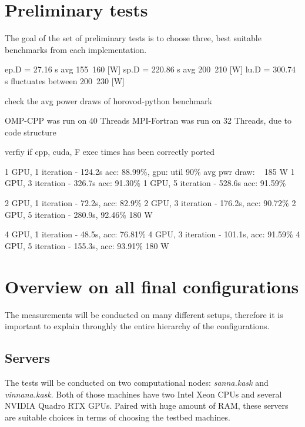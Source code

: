 \section{Preliminary tests}

The goal of the set of preliminary tests is to choose three, best suitable
benchmarks from each implementation. 

\newpage





\newpage







ep.D = 27.16 s          avg 155~160 [W]
sp.D = 220.86 s         avg 200~210 [W]
lu.D = 300.74 s         fluctuates between 200~230 [W]


check the avg power draws of horovod-python benchmark

OMP-CPP was run on 40 Threads
MPI-Fortran was run on 32 Threads, due to code structure

verfiy if cpp, cuda, F exec times has been correctly ported


1 GPU, 1 iteration - 124.2s acc: 88.99\%, gpu: util 90\% avg pwr draw: ~ 185 W
1 GPU, 3 iteration - 326.7s acc: 91.30\%
1 GPU, 5 iteration - 528.6s acc: 91.59\%

2 GPU, 1 iteration - 72.2s, acc: 82.9\%
2 GPU, 3 iteration - 176.2s, acc: 90.72\%
2 GPU, 5 iteration - 280.9s, 92.46\%     180 W

4 GPU, 1 iteration - 48.5s, acc: 76.81\%
4 GPU, 3 iteration - 101.1s, acc: 91.59\%
4 GPU, 5 iteration - 155.3s, acc: 93.91\% 180 W

\newpage
\section{Overview on all final configurations}

The measurements will be conducted on many different setups, therefore it is
important to explain throughly the entire hierarchy of the configurations.

\subsection{Servers}
The tests will be conducted on two computational nodes: \emph{sanna.kask}
and \emph{vinnana.kask}\@. Both of those machines have two Intel Xeon CPUs and
several NVIDIA Quadro RTX GPUs. Paired with huge amount of RAM, these servers
are suitable choices in terms of choosing the testbed machines.

